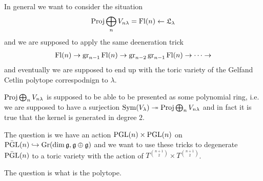 \documentclass[12pt]{article}
\begin{document}
In general we want to consider the situation \begin{align*}
    \operatorname{Proj} \bigoplus_n V_{n\lambda} = \operatorname{Fl}(n) \leftarrow \mathfrak{L}_\lambda
\end{align*} and we are supposed to apply the same deeneration trick \begin{align*}
    \operatorname{Fl}(n)\to \operatorname{gr}_{n-1}\operatorname{Fl}(n)\to \operatorname{gr}_{n-2}\operatorname{gr}_{n-1}\operatorname{Fl}(n) \to \dots \to 
\end{align*} and eventually we are supposed to end up with the toric variety
of the Gelfand Cetlin polytope correspodnign to $\lambda$.

\hfill

$\operatorname{Proj} \bigoplus_n V_{n\lambda}$ is supposed to be able to be presented as some polynomial ring,
i.e. we are supposed to have a surjection $\operatorname{Sym}(V_\lambda) \twoheadrightarrow \operatorname{Proj} \bigoplus_n V_{n\lambda}$
and in fact it is true that the kernel is generated in degree $2$.

\hfill

The question is we have an action $\operatorname{PGL}(n)\times\operatorname{PGL}(n)$ on $\bar{\operatorname{PGL}}(n)\hookrightarrow\operatorname{Gr}(\dim \mathfrak{g}, \mathfrak{g}\oplus\mathfrak{g})$
and we want to use these tricks to degenerate $\bar{\operatorname{PGL}}(n)$ to a toric variety with the action of $T^{\binom{n+1}{2}}\times T^{\binom{n+1}{2}}$.

\hfill

The question is what is the polytope.
\end{document}
